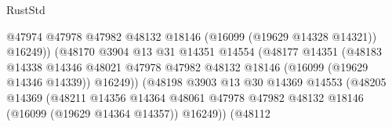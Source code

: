 \begin{lexlean}{RustStd}
\begin{coremodule}
                                                  @47974
                                                  @47978
                                                  @47982
                                                  @48132
                                                  @18146
                                                  (@16099 (@19629 @14328 @14321))
                                                  @16249))
                                              (@48170
                                                @3904
                                                @13
                                                @31
                                                @14351
                                                @14554
                                                (@48177
                                                  @14351
                                                  (@48183
                                                    @14338
                                                    @14346
                                                    @48021
                                                    @47978
                                                    @47982
                                                    @48132
                                                    @18146
                                                    (@16099 (@19629 @14346 @14339))
                                                    @16249))
                                                (@48198
                                                  @3903
                                                  @13
                                                  @30
                                                  @14369
                                                  @14553
                                                  (@48205
                                                    @14369
                                                    (@48211
                                                      @14356
                                                      @14364
                                                      @48061
                                                      @47978
                                                      @47982
                                                      @48132
                                                      @18146
                                                      (@16099 (@19629 @14364 @14357))
                                                      @16249))
                                                  (@48112

\end{coremodule}
\end{lexlean}
